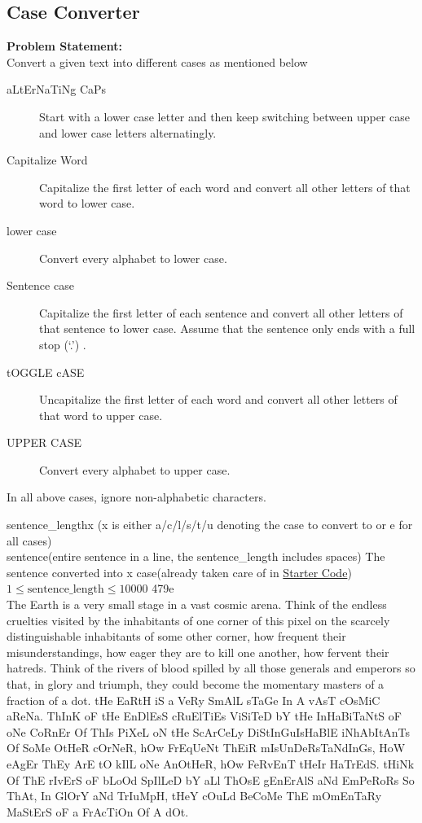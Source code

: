 {\scriptsize
\subsection{Case Converter}
\textbf{Problem Statement:}\\
Convert a given text into different cases as mentioned below
\begin{description}
	\item[aLtErNaTiNg CaPs] Start with a lower case letter and then keep switching between upper case and lower case letters alternatingly.
	\item[Capitalize Word] Capitalize the first letter of each word and convert all other letters of that word to lower case.
	\item[lower case] Convert every alphabet to lower case.
	\item[Sentence case] Capitalize the first letter of each sentence and convert all other letters of that sentence to lower case. Assume that the sentence only ends with a full stop (`.') .
	\item[tOGGLE cASE] Uncapitalize the first letter of each word and convert all other letters of that word to upper case.
	\item[UPPER CASE] Convert every alphabet to upper case.
\end{description}
\begin{note}
	In all above cases, ignore non-alphabetic characters.
\end{note}
\begin{testcases}
	{sentence\_length\quad x \hfill(x is either a/c/l/s/t/u denoting the case to convert to or e for all cases)\\
	sentence\hfill(entire sentence in a line, the sentence\_length includes spaces)}
	{The sentence converted into x case\hfill{(already taken care of in \href{https://github.com/paramrathour/CS-101/tree/main/Starter Codes/Case Converter.cpp}{Starter Code})}}
	{$1 \leq \text{sentence\_length} \leq 10000$}
	{479\quad e\\The Earth is a very small stage in a vast cosmic arena. Think of the endless cruelties visited by the inhabitants of one corner of this pixel on the scarcely distinguishable inhabitants of some other corner, how frequent their misunderstandings, how eager they are to kill one another, how fervent their hatreds. Think of the rivers of blood spilled by all those generals and emperors so that, in glory and triumph, they could become the momentary masters of a fraction of a dot.}
	{tHe EaRtH iS a VeRy SmAlL sTaGe In A vAsT cOsMiC aReNa. ThInK oF tHe EnDlEsS cRuElTiEs ViSiTeD bY tHe InHaBiTaNtS oF oNe CoRnEr Of ThIs PiXeL oN tHe ScArCeLy DiStInGuIsHaBlE iNhAbItAnTs Of SoMe OtHeR cOrNeR, hOw FrEqUeNt ThEiR mIsUnDeRsTaNdInGs, HoW eAgEr ThEy ArE tO kIlL oNe AnOtHeR, hOw FeRvEnT tHeIr HaTrEdS. tHiNk Of ThE rIvErS oF bLoOd SpIlLeD bY aLl ThOsE gEnErAlS aNd EmPeRoRs So ThAt, In GlOrY aNd TrIuMpH, tHeY cOuLd BeCoMe ThE mOmEnTaRy MaStErS oF a FrAcTiOn Of A dOt.\\\\
}
\end{testcases}}
